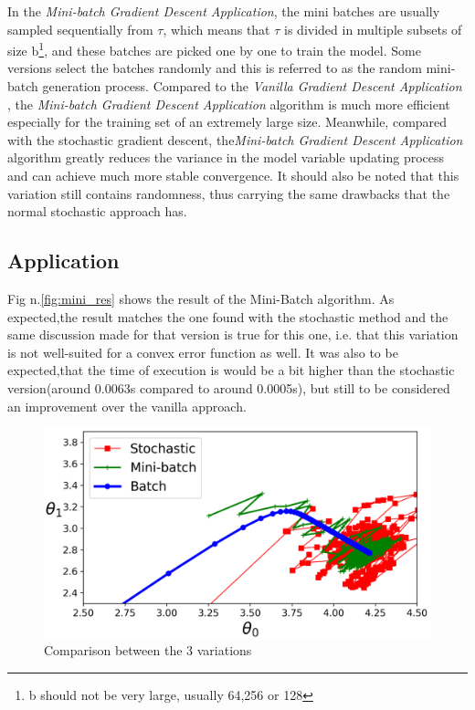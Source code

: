 \documentclass[conference]{IEEEtran}
\begin{document}
In the \textit{Mini-batch Gradient Descent Application}, the mini batches are usually sampled sequentially from $\tau$, which means that $\tau$ is divided in multiple subsets of size b\footnote{b should not be very large, usually 64,256 or 128}, and these batches are picked one by one to train the model. Some versions select the batches randomly and this is referred to as the random mini-batch generation process. Compared to the
\textit{Vanilla Gradient Descent Application} , the \textit{Mini-batch Gradient Descent Application} algorithm is much more efficient especially for the training set of an extremely large size. Meanwhile, compared with the stochastic gradient descent, the\textit{Mini-batch Gradient Descent Application} algorithm greatly reduces the variance in the model variable updating process and can achieve much more stable convergence.\cite{JZ2019} It should also be noted that this variation still contains randomness, thus carrying the same drawbacks that the normal stochastic approach has. 



\subsection{Application}
Fig n.\ref{fig:mini_res} shows the result of the Mini-Batch algorithm. As expected,the result matches the one found with the stochastic method and the same discussion made for that version is true for this one, i.e. that this variation is not well-suited for a convex error function as well. 
It was also to be expected,that the time of execution is would be a bit higher than the stochastic version(around 0.0063s compared to around 0.0005s), but still to be considered an improvement over the vanilla approach. 


\begin{center}
\begin{figure}[!htbp]
\centering
    \includegraphics[scale = 0.3]{Figures/comp.png}
    \caption{Comparison between the 3 variations\cite{Scikit-Learn}}
    \label{fig:comparison}

\end{figure}
\end{center}
\end{document}
